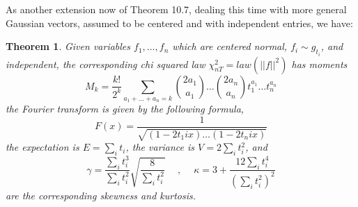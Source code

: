 \documentclass[12pt]{amsbook}
\newtheorem{theorem}{Theorem}[chapter]
\begin{document}
As another extension now of Theorem 10.7, dealing this time with more general Gaussian vectors, assumed to be centered and with independent entries, we have:

\begin{theorem}
Given variables $f_1,\ldots,f_n$ which are centered normal, $f_i\sim g_{t_i}$, and independent, the corresponding chi squared law $\chi_{nT}^2=law(||f||^2)$ has moments
$$M_k=\frac{k!}{2^k}\sum_{a_1+\ldots+a_n=k}\binom{2a_1}{a_1}\ldots\binom{2a_n}{a_n}t_1^{a_1}\ldots t_n^{a_n}$$
the Fourier transform is given by the following formula,
$$F(x)=\frac{1}{\sqrt{(1-2t_1ix)\ldots(1-2t_nix)}}$$
the expectation is $E=\sum_it_i$, the variance is $V=2\sum_it_i^2$, and
$$\gamma=\frac{\sum_it_i^3}{\sum_it_i^2}\sqrt{\frac{8}{\sum_it_i^2}}\quad\ ,\ \quad
\kappa=3+\frac{12\sum_it_i^4}{(\sum_it_i^2)^2}$$
are the corresponding skewness and kurtosis.
\end{theorem}
\end{document}
